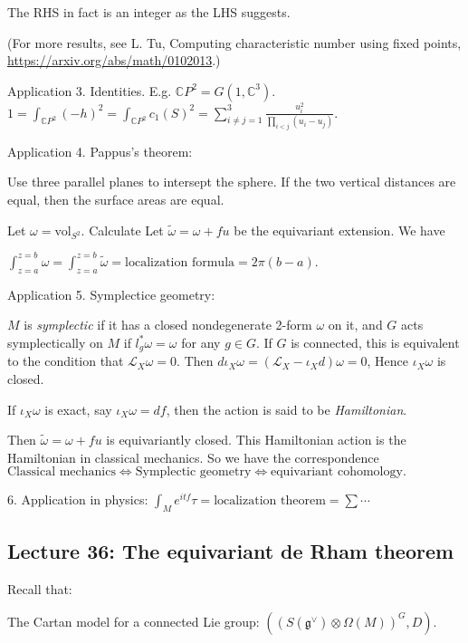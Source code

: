 \documentclass{article}
\theoremstyle{mystyle}
\theoremstyle{remark}
\numberwithin{equation}{section}
\begin{document}
The RHS in fact is an integer as the LHS suggests.

(For more results, see L. Tu, Computing characteristic number using fixed points, \url{https://arxiv.org/abs/math/0102013}.)

Application 3. Identities. E.g.
$\mathbb{C}P^2 = G(1,\mathbb{C}^3)$. 
$1 = \int_{\mathbb{C}P^2} (-h)^2 = \int_{\mathbb{C}P^2} c_1(S)^2 = \sum_{i\neq  j=1}^3 \frac{u_i^2}{\prod_{i<j}(u_i-u_j)}$. 


Application 4. Pappus's theorem:

Use three parallel planes to intersept the sphere. If the two vertical distances are equal, then the surface areas are equal.

Let $\omega = \text{vol}_{S^2}$. Calculate Let $\widetilde{\omega}=\omega + fu$ be the equivariant extension. We have

$\int^{z=b}_{z=a}\omega = \int^{z=b}_{z=a}\widetilde{\omega} = \text{localization formula}
= 2\pi(b-a).$

Application 5. Symplectice geometry: 

$M$ is \emph{symplectic} if it has a closed nondegenerate 2-form $\omega$ on it, and $G$ acts symplectically on $M$ if $l_g^*\omega = \omega$ for any $g\in G$. If $G$ is connected, this is equivalent to the condition that $\mathcal{L}_X\omega=0$. Then $d\iota_X\omega = (\mathcal{L}_X-\iota_X d)\omega = 0$, Hence $\iota_X\omega$ is closed.

If $\iota_X\omega$ is exact, say $\iota_X\omega = df$, then the action is said to be \emph{Hamiltonian}.

Then $\widetilde{\omega} = \omega + fu$ is equivariantly closed. This Hamiltonian action is the Hamiltonian in classical mechanics. So we have the correspondence
$\text{Classical mechanics} \Leftrightarrow 
\text{Symplectic geometry} \Leftrightarrow \text{equivariant cohomology}.$

6. Application in physics: $\int_M e^{it f}\tau = \text{localization theorem} = \sum \cdots$







\subsection{Lecture 36: The equivariant de Rham theorem}

Recall that:

The Cartan model for a connected Lie group: $\left((S(\mathfrak{g}^\vee)\otimes \Omega(M))^G,D\right)$.
\end{document}
